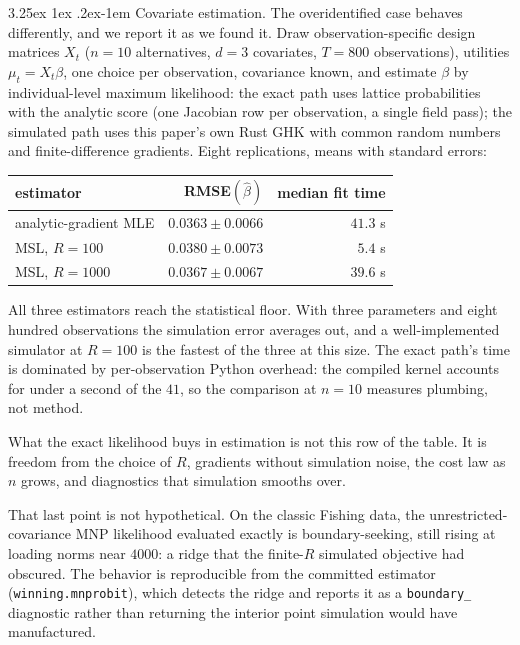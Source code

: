 \documentclass[11pt]{article}
\makeatletter
\renewcommand\paragraph{\@startsection{paragraph}{4}{\z@}%
  {3.25ex \@plus1ex \@minus.2ex}{-1em}%
  {\normalfont\normalsize\itshape}}
\makeatother
\begin{document}
\paragraph{Covariate estimation.} The overidentified case behaves
differently, and we report it as we found it. Draw observation-specific
design matrices $X_t$ ($n=10$ alternatives, $d=3$ covariates,
$T=800$ observations), utilities $\mu_t=X_t\beta$, one choice per
observation, covariance known, and estimate $\beta$ by individual-level
maximum likelihood: the exact path uses lattice probabilities with the
analytic score (one Jacobian row per observation, a single field pass);
the simulated path uses this paper's own Rust GHK with common random
numbers and finite-difference gradients. Eight replications, means with
standard errors:

\begin{center}\small
\begin{tabular}{lrr}
\toprule
estimator & RMSE$(\hat\beta)$ & median fit time \\
\midrule
analytic-gradient MLE & $0.0363\pm0.0066$ & $41.3$ s \\
MSL, $R=100$ & $0.0380\pm0.0073$ & $5.4$ s \\
MSL, $R=1000$ & $0.0367\pm0.0067$ & $39.6$ s \\
\bottomrule
\end{tabular}
\end{center}

\noindent All three estimators reach the statistical floor. With three
parameters and eight hundred observations the simulation error averages
out, and a well-implemented simulator at $R=100$ is the fastest of the
three at this size. The exact path's time is dominated by per-observation
Python overhead: the compiled kernel accounts for under a second of the
$41$, so the comparison at $n=10$ measures plumbing, not method.

What the exact likelihood buys in estimation is not this row of the
table. It is freedom from the choice of $R$, gradients without simulation
noise, the cost law as $n$ grows, and diagnostics that simulation smooths
over.

That last point is not hypothetical. On the classic Fishing data, the
unrestricted-covariance MNP likelihood evaluated exactly is
boundary-seeking, still rising at loading norms near $4000$: a ridge
that the finite-$R$ simulated objective had obscured. The behavior is
reproducible from the committed estimator (\texttt{winning.mnprobit}),
which detects the ridge and reports it as a \texttt{boundary\_}
diagnostic rather than returning the interior point simulation would have
manufactured.
\end{document}

